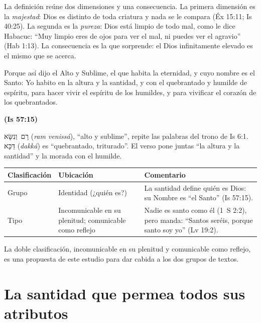 \documentclass[11pt,letterpaper]{article}
\newcommand{\heb}[1]{\mbox{\foreignlanguage{hebrew}{#1}}}
\newcommand{\fuente}[1]{\par\hfill{\upshape\bfseries\small\textcolor{azul}{#1}}}
\begin{document}
La definición reúne dos dimensiones y una consecuencia. La primera dimensión es la \emph{majestad}: Dios es distinto de toda criatura y nada se le compara (Éx 15:11; Is 40:25). La segunda es la \emph{pureza}: Dios está limpio de todo mal, como le dice Habacuc: ``Muy limpio eres de ojos para ver el mal, ni puedes ver el agravio'' (Hab 1:13). La consecuencia es la que sorprende: el Dios infinitamente elevado es el mismo que se acerca.

\begin{cita}Porque así dijo el Alto y Sublime, el que habita la eternidad, y cuyo nombre es el Santo: Yo habito en la altura y la santidad, y con el quebrantado y humilde de espíritu, para hacer vivir el espíritu de los humildes, y para vivificar el corazón de los quebrantados.\fuente{(Is 57:15)}\end{cita}

\begin{filologia}[Is 57:15]
\heb{רָם וְנִשָּׂא} (\emph{ram venissá}), ``alto y sublime'', repite las palabras del trono de Is 6:1. \heb{דַּכָּא} (\emph{dakká}) es ``quebrantado, triturado''. El verso pone juntas ``la altura y la santidad'' y la morada con el humilde.
\end{filologia}

\begin{center}\small\renewcommand{\arraystretch}{1.3}
\begin{tabular}{@{}L{3.6cm}L{5.4cm}L{5.4cm}@{}}
\toprule
\textbf{Clasificación} & \textbf{Ubicación} & \textbf{Comentario} \\ \midrule
Grupo & Identidad (¿quién es?) & La santidad define quién es Dios: su Nombre es ``el Santo'' (Is 57:15). \\
Tipo & Incomunicable en su plenitud; comunicable como reflejo & Nadie es santo como él (1~S 2:2), pero manda: ``Santos seréis, porque santo soy yo'' (Lv 19:2). \\
\bottomrule
\end{tabular}\end{center}

\begin{nota}[Precisión]
La doble clasificación, incomunicable en su plenitud y comunicable como reflejo, es una propuesta de este estudio para dar cabida a los dos grupos de textos.
\end{nota}

\section{La santidad que permea todos sus atributos}
\end{document}
